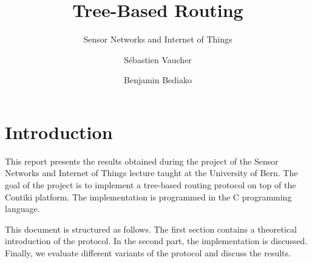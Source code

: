 \documentclass[a4paper]{llncs}
\begin{document}
\title{Tree-Based Routing}


\subtitle{Sensor Networks and Internet of Things}

\author{Sébastien Vaucher \and Benjamin Bediako}






\maketitle
\thispagestyle{plain}

\section{Introduction}

This report presents the results obtained during the project of the Sensor Networks and Internet of Things lecture taught at the University of Bern.
The goal of the project is to implement a tree-based routing protocol on top of the Contiki platform.
The implementation is programmed in the C programming language.

This document is structured as follows.
The first section contains a theoretical introduction of the protocol.
In the second part, the implementation is discussed.
Finally, we evaluate different variants of the protocol and discuss the results.
\end{document}
